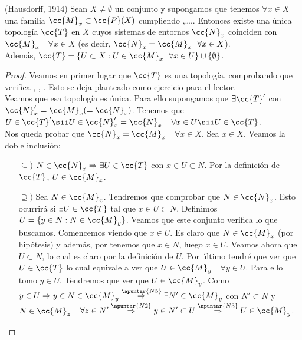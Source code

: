 \begin{prop}
    (Hausdorff, 1914) Sean $X\neq \emptyset$ un conjunto y supongamos que tenemos $\forall x \in X$ una familia $\cc{M}_x\subset \cc{P}(X)$ cumpliendo ,\dots,. Entonces existe una única topología $\cc{T}$ en $X$ cuyos sistemas de entornos $\cc{N}_x$ coinciden con $\cc{M}_x$\ \ $\forall x \in X$ (es decir, $\cc{N}_x = \cc{M}_x\ \ \forall x \in X$).\\

    Además, $\cc{T} = \{U\subset X : U \in \cc{M}_x\ \ \forall x \in U\}\cup\{\emptyset\}$.

    \begin{proof}
        Veamos en primer lugar que $\cc{T}$ es una topología, comprobando que verifica , , . Esto se deja planteado como ejercicio para el lector.\\

        Veamos que esa topología es única. Para ello supongamos que $\exists \cc{T}'$ con $\cc{N}_x'=\cc{M}_x(=\cc{N}_x)$. Tenemos que $U\in \cc{T}' \sii U\in \cc{N}_x'=\cc{N}_x$\ \ $\forall x \in U \sii U \in \cc{T}$.\\

        Nos queda probar que $\cc{N}_x = \cc{M}_x$\ \ $\forall x \in X$. Sea $x\in X$. Veamos la doble inclusión:
        \begin{itemize}
            \item[$\subseteq)$] $N\in \cc{N}_x \Rightarrow \exists U \in \cc{T}$ con $x\in U\subset N$. Por la definición de $\cc{T}$, $U\in \cc{M}_x$.
            \item[$\supseteq)$] Sea $N\in \cc{M}_x$. Tendremos que comprobar que $N \in \cc{N}_x$. Esto ocurrirá si $\exists U\in \cc{T}$ tal que $x\in U \subset N$. Definimos $U=\{y\in N : N\in \cc{M}_y\}$. Veamos que este conjunto verifica lo que buscamos. Comencemos viendo que $x\in U$. Es claro que $N\in \cc{M}_x$ (por hipótesis) y además, por  tenemos que $x\in N$, luego $x\in U$. Veamos ahora que $U\subset N$, lo cual es claro por la definición de $U$. Por último tendré que ver que $U\in \cc{T}$ lo cual equivale a ver que $U\in \cc{M}_y$\ \ $\forall y \in U$. Para ello tomo $y\in U$. Tendremos que ver que $U\in \cc{M}_y$. Como $y\in U \Rightarrow y\in N\in \cc{M}_y \overset{\apuntar{N5}}{\Rightarrow} \exists N'\in \cc{M}_y$ con $N'\subset N$ y $N\in \cc{M}_z$\ \  $\forall z \in N' \overset{\apuntar{N2}}{\Rightarrow} y \in N' \subset U \overset{\apuntar{N3}}{\Rightarrow} U \in \cc{M}_y $.
        \end{itemize}
    \end{proof}
\end{prop}

